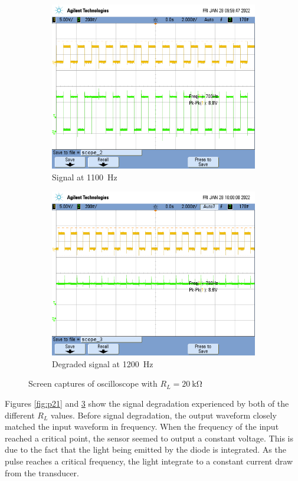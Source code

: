 \documentclass[CMPE]{../KGCOEReport}
\begin{document}
	\begin{figure}[ht]
	\begin{subfigure}{.5\textwidth}
	  \centering
	  \includegraphics[width=.8\linewidth]{p1100_20k}
	  \caption{Signal at \SI{1100}{\hertz}}
	  \label{fig:sub-first}
	\end{subfigure}
	\begin{subfigure}{.5\textwidth}
	  \centering
	  \includegraphics[width=.8\linewidth]{p1200_20k}
	  \caption{Degraded signal at \SI{1200}{\hertz}}
	  \label{fig:sub-second}
	\end{subfigure}
	\caption{Screen captures of oscilloscope with $R_L=\SI{20}{\kilo\ohm}$}
	\label{fig:p22}
	\end{figure}

	Figures \ref{fig:p21} and \ref{fig:p22} show the signal degradation experienced
	by both of the different $R_L$ values. Before signal degradation, the output
	waveform closely matched the input waveform in frequency. When the frequency of
	the input reached a critical point, the sensor seemed to output a constant
	voltage. This is due to the fact that the light being emitted by the diode
	is integrated. As the pulse reaches a critical frequency, the light integrate to
	a constant current draw from the transducer.
\end{document}
